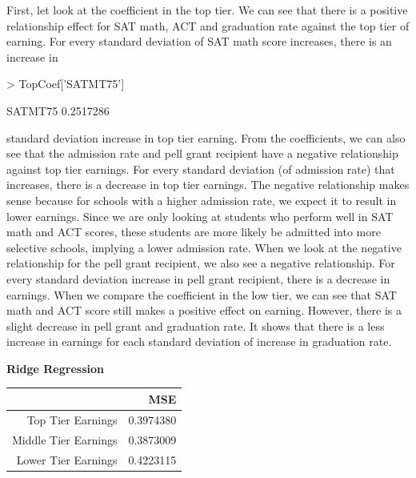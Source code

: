 \documentclass{article}
\begin{document}
First, let look at the coefficient in the top tier.  We can see that there is a positive relationship effect for SAT math, ACT and graduation rate against the top tier of earning.  For every standard deviation of SAT math score increases, there is an increase in 
\begin{Schunk}
\begin{Sinput}
> TopCoef['SATMT75']
\end{Sinput}
\begin{Soutput}
  SATMT75 
0.2517286 
\end{Soutput}
\end{Schunk}
standard deviation increase in top tier earning. From the coefficients, we can also see that the admission rate and pell grant recipient have a negative relationship against top tier earnings.  For every standard deviation (of admission rate) that increases, there is a decrease in top tier earnings.  The negative relationship makes sense because for schools with a higher admission rate, we expect it to result in lower earnings.  Since we are only looking at students who perform well in SAT math and ACT scores, these students are more likely be admitted into more selective schools, implying a lower admission rate.  When we look at the negative relationship for the pell grant recipient, we also see a negative relationship.  For every standard deviation increase in pell grant recipient, there is a decrease in earnings. 
When we compare the coefficient in the low tier, we can see that SAT math and ACT score still makes a positive effect on earning. However, there is a slight decrease in pell grant and graduation rate.  It shows that there is a less increase in earnings for each standard deviation of increase in graduation rate. 
\newline
\newline

\textbf{Ridge Regression}\newline
\begin{table}[ht]
\centering
\begin{tabular}{rr}
  \hline
 & MSE \\ 
  \hline
Top Tier Earnings & 0.3974380 \\ 
  Middle Tier Earnings & 0.3873009 \\ 
  Lower Tier Earnings & 0.4223115 \\ 
   \hline
\end{tabular}
\end{table}\newline
\end{document}
